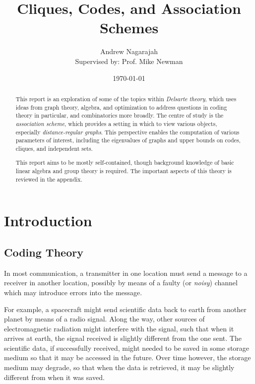 \documentclass{report}
\title{Cliques, Codes, and Association Schemes}
\author{
  Andrew Nagarajah \\
  Supervised by: Prof. Mike Newman
}
\date{\today}
\begin{document}
\maketitle

\begin{abstract}

  This report is an exploration of some of the topics within \emph{Delsarte
  theory}, which uses ideas from graph theory, algebra, and optimization to
  address questions in coding theory in particular, and combinatorics more
  broadly.  The centre of study is the \emph{association scheme}, which provides
  a setting in which to view various objects, especially \emph{distance-regular
  graphs}.  This perspective enables the computation of various parameters of
  interest, including the eigenvalues of graphs and upper bounds on codes,
  cliques, and independent sets.

  This report aims to be mostly self-contained, though background knowledge of
  basic linear algebra and group theory is required.  The important aspects of
  this theory is reviewed in the appendix.

\end{abstract}

\tableofcontents

\chapter{Introduction}\label{ch:intro}
  \section{Coding Theory}\label{sec:intro:coding}
    In most communication, a transmitter in one location must send a message to
    a receiver in another location, possibly by means of a faulty (or
    \textit{noisy}) channel which may introduce errors into the message.

    For example, a spacecraft might send scientific data back to earth from
    another planet by means of a radio signal.  Along the way, other sources of
    electromagnetic radiation might interfere with the signal, such that when it
    arrives at earth, the signal received is slightly different from the one
    sent.
    The scientific data, if successfully received, might needed to be saved in
    some storage medium so that it may be accessed in the future.  Over time
    however, the storage medium may degrade, so that when the data is retrieved,
    it may be slightly different from when it was saved.
\end{document}
